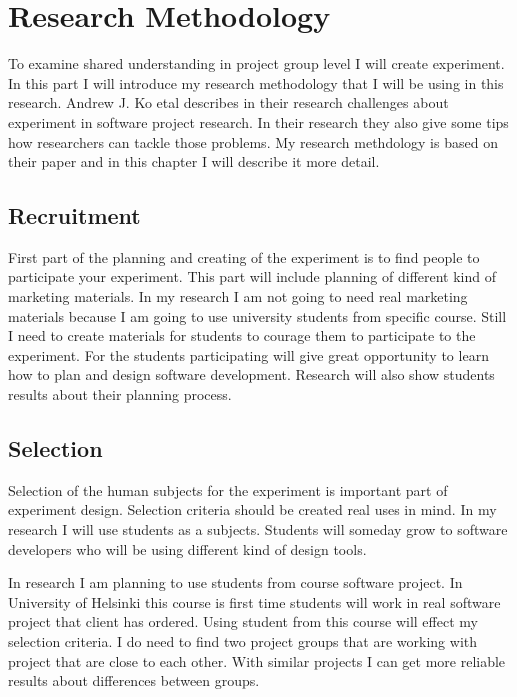 \documentclass[english]{tktltiki2}
\theoremstyle{definition}
\theoremstyle{remark}
\begin{document}
\section{Research Methodology}

To examine shared understanding in project group level I will create experiment. In this part I will introduce my research methodology that I will be using in this research. Andrew J. Ko etal\cite{experiment} describes in their research challenges about experiment in software project research. In their research they also give some tips how researchers can tackle those problems. My research methdology is based on their paper and in this chapter I will describe it more detail.

\subsection{Recruitment}

First part of the planning and creating of the experiment is to find people to participate your experiment. This part will include planning of different kind of marketing materials\cite{experiment}. In my research I am not going to need real marketing materials because I am going to use university students from specific course. Still I need to create materials for students to courage them to participate to the experiment. For the students participating will give great opportunity to learn how to plan and design software development. Research will also show students results about their planning process.

\subsection{Selection}

Selection of the human subjects for the experiment is important part of experiment design. Selection criteria should be created real uses in mind\cite{experiment}. In my research I will use students as a subjects. Students will someday grow to software developers who will be using different kind of design tools.

In research I am planning to use students from course software project. In University of Helsinki this course is first time students will work in real software project that client has ordered. Using student from this course will effect my selection criteria. I do need to find two project groups that are working with project that are close to each other. With similar projects I can get more reliable results about differences between groups.
\end{document}
